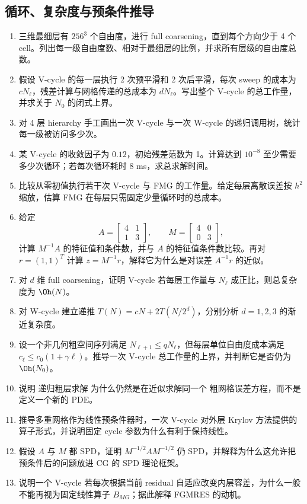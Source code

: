 \subsection*{循环、复杂度与预条件推导}
\begin{enumerate}[label=\arabic*.]
\item 三维最细层有 $256^3$ 个自由度，进行 full coarsening，直到每个方向少于 4 个 cell。列出每一级自由度数、相对于最细层的比例，并求所有层级的自由度总数。
\item 假设 V-cycle 的每一层执行 2 次预平滑和 2 次后平滑，每次 sweep 的成本为 $cN_\ell$，残差计算与网格传递的总成本为 $dN_\ell$。写出整个 V-cycle 的总工作量，并求关于 $N_0$ 的闭式上界。
\item 对 4 层 hierarchy 手工画出一次 V-cycle 与一次 W-cycle 的递归调用树，统计每一级被访问多少次。
\item 某 V-cycle 的收敛因子为 $0.12$，初始残差范数为 1。计算达到 $10^{-8}$ 至少需要多少次循环；若每次循环耗时 8 ms，求总求解时间。
\item 比较从零初值执行若干次 V-cycle 与 FMG 的工作量。给定每层离散误差按 $h^2$ 缩放，估算 FMG 在每层只需固定少量循环时的总成本。
\item 给定
\[
A=\begin{bmatrix}4&1\\1&3\end{bmatrix},\qquad
M=\begin{bmatrix}4&0\\0&3\end{bmatrix},
\]
计算 $M^{-1}A$ 的特征值和条件数，并与 $A$ 的特征值条件数比较。再对 $r=(1,1)^T$ 计算 $z=M^{-1}r$，解释它为什么是对误差 $A^{-1}r$ 的近似。

\item 对 $d$ 维 full coarsening，证明 V-cycle 若每层工作量与 $N_\ell$ 成正比，则总复杂度为 $\Oh(N)$。
\item 对 W-cycle 建立递推 $T(N)=cN+2T(N/2^d)$，分别分析 $d=1,2,3$ 的渐近复杂度。
\item 设一个非几何粗空间序列满足 $N_{\ell+1}\le qN_\ell$，但每层单位自由度成本满足 $c_\ell\le c_0(1+\gamma\ell)$。推导一次 V-cycle 总工作量的上界，并判断它是否仍为 $\Oh(N_0)$。
\item 说明 递归粗层求解 为什么仍然是在近似求解同一个 粗网格误差方程，而不是定义一个新的 PDE。
\item 推导多重网格作为线性预条件器时，一次 V-cycle 对外层 Krylov 方法提供的算子形式，并说明固定 cycle 参数为什么有利于保持线性。
\item 假设 $A$ 与 $M$ 都 SPD，证明 $M^{-1/2}AM^{-1/2}$ 仍 SPD，并解释为什么这允许把预条件后的问题放进 CG 的 SPD 理论框架。
\item 说明一个 V-cycle 若每次根据当前 residual 自适应改变内层容差，为什么一般不能再视为固定线性算子 $B_{MG}$；据此解释 FGMRES 的动机。
\end{enumerate}

